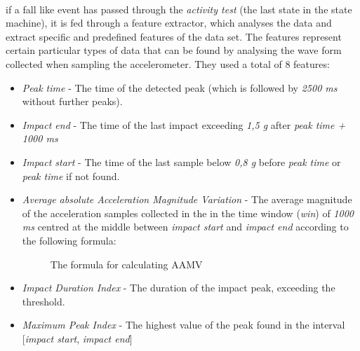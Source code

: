 \documentclass[12pt, a4paper, onecolumn]{article}
\begin{document}
			
		
		\paragraph{} if a fall like event has passed through the  \textit{activity test} (the last state in the state machine), it is fed through a feature extractor, which analyses the data and extract specific and predefined features of the data set. The features represent certain particular types of data that can be found by analysing the wave form collected when sampling the accelerometer. They used a total of 8 features:
		
		\begin{itemize}
			\item \textit{Peak time} - The time of the detected peak (which is followed by \textit{2500 ms} without further peaks).
			\item \textit{Impact end} - The time of the last impact exceeding \textit{1,5 g} after \textit{peak time + 1000 ms}
			\item  \textit{Impact start} - The time of the last sample below \textit{0,8 g} before \textit{peak time} or \textit{peak time} if not found.
			
			\item \textit{Average absolute Acceleration Magnitude Variation} - The average magnitude of the acceleration samples collected in the in the time window (\textit{win}) of \textit{1000 ms} centred at the middle between \textit{impact start} and \textit{impact end} according to the following formula:
			
				
				\begin{figure}[h]
					\centering
					\caption{The formula for calculating AAMV \cite{piza_uni}}%
					\label{fig:example}%
				\end{figure}
			
			\item \textit{Impact Duration Index} - The duration of the impact peak, exceeding the threshold.
			\item \textit{Maximum Peak Index} - The highest value of the peak found in the interval [\textit{impact start}, \textit{impact end}]
			

\end{itemize}
\end{document}
